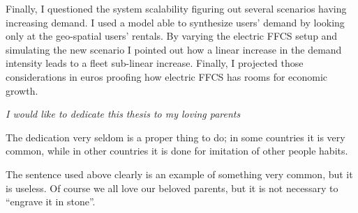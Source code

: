 \documentclass[%
   corpo=12pt, %
   oneside, %
   tipotesi=scudo,
   mybibliostyle, %
  numerazioneromana, %
   ]{toptesi}
\begin{document}
Finally, I questioned the system scalability figuring out several scenarios having increasing demand. I used a model able to synthesize users' demand by looking only at the geo-spatial users' rentals. By varying the electric FFCS setup and simulating the new scenario I pointed out how a linear increase in the demand intensity leads to a fleet sub-linear increase. Finally, I projected those considerations in euros proofing how electric FFCS has rooms for economic growth. 

\begin{dedication}

\textit{I would like to dedicate this thesis to my loving parents} 

{\normalsize 
The dedication very seldom is a proper thing to do; in some countries it is very common, while in other countries it is done for imitation of other people habits. 

The sentence used above clearly is an example of something very common, but it is  useless. Of course we all love our beloved parents, but it is not necessary to ``engrave it in stone''.
\par}
\end{dedication}


\allcontents

\mainmatter %









%


%
%

\backmatter%
%

\printnomencl



\printbibliography[heading=bibintoc]


\printindex
\end{document}
